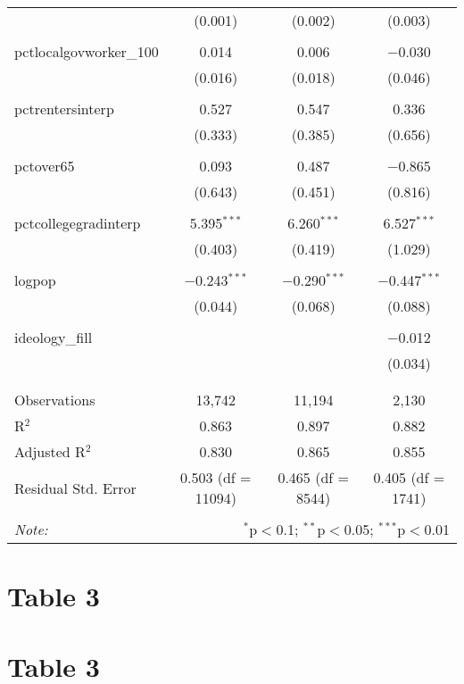 \documentclass[]{article}
\begin{document}
\begin{table}[!htbp]
\begin{tabular}{@{\extracolsep{5pt}}lccc}
  & (0.001) & (0.002) & (0.003) \\ 
  & & & \\ 
 pctlocalgovworker\_100 & 0.014 & 0.006 & $-$0.030 \\ 
  & (0.016) & (0.018) & (0.046) \\ 
  & & & \\ 
 pctrentersinterp & 0.527 & 0.547 & 0.336 \\ 
  & (0.333) & (0.385) & (0.656) \\ 
  & & & \\ 
 pctover65 & 0.093 & 0.487 & $-$0.865 \\ 
  & (0.643) & (0.451) & (0.816) \\ 
  & & & \\ 
 pctcollegegradinterp & 5.395$^{***}$ & 6.260$^{***}$ & 6.527$^{***}$ \\ 
  & (0.403) & (0.419) & (1.029) \\ 
  & & & \\ 
 logpop & $-$0.243$^{***}$ & $-$0.290$^{***}$ & $-$0.447$^{***}$ \\ 
  & (0.044) & (0.068) & (0.088) \\ 
  & & & \\ 
 ideology\_fill &  &  & $-$0.012 \\ 
  &  &  & (0.034) \\ 
  & & & \\ 
\hline \\[-1.8ex] 
Observations & 13,742 & 11,194 & 2,130 \\ 
R$^{2}$ & 0.863 & 0.897 & 0.882 \\ 
Adjusted R$^{2}$ & 0.830 & 0.865 & 0.855 \\ 
Residual Std. Error & 0.503 (df = 11094) & 0.465 (df = 8544) & 0.405 (df = 1741) \\ 
\hline 
\hline \\[-1.8ex] 
\textit{Note:}  & \multicolumn{3}{r}{$^{*}$p$<$0.1; $^{**}$p$<$0.05; $^{***}$p$<$0.01} \\ 
\end{tabular} 
\end{table}

\hypertarget{table-3}{%
\section{Table 3}\label{table-3}}

\hypertarget{table-3-1}{%
\section{Table 3}\label{table-3-1}}
\end{document}
